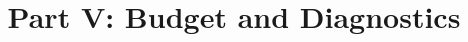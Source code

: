 \documentclass[12pt]{book}
\begin{document}
\title{Part V: Budget and Diagnostics}
\dominitoc
\tableofcontents


\end{document}
